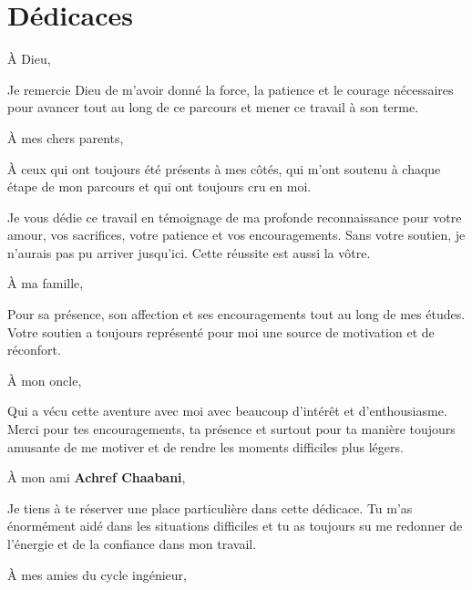 \chapter*{Dédicaces}

\vspace{2cm}

\begin{flushleft}
  À Dieu,

Je remercie Dieu de m'avoir donné la force, la patience et le courage nécessaires
pour avancer tout au long de ce parcours et mener ce travail à son terme.

\vspace{0.4cm}

À mes chers parents,

À ceux qui ont toujours été présents à mes côtés, qui m'ont soutenu à chaque étape
de mon parcours et qui ont toujours cru en moi.

Je vous dédie ce travail en témoignage de ma profonde reconnaissance pour votre amour,
vos sacrifices, votre patience et vos encouragements. Sans votre soutien, je n'aurais
pas pu arriver jusqu'ici. Cette réussite est aussi la vôtre.

\vspace{0.4cm}

À ma famille,

Pour sa présence, son affection et ses encouragements tout au long de mes études.
Votre soutien a toujours représenté pour moi une source de motivation et de réconfort.

\vspace{0.4cm}

À mon oncle,

Qui a vécu cette aventure avec moi avec beaucoup d'intérêt et d'enthousiasme.
Merci pour tes encouragements, ta présence et surtout pour ta manière toujours
amusante de me motiver et de rendre les moments difficiles plus légers.

\vspace{0.4cm}

À mon ami \textbf{Achref Chaabani},

Je tiens à te réserver une place particulière dans cette dédicace.
Tu m'as énormément aidé dans les situations difficiles et tu as toujours su me redonner
de l'énergie et de la confiance dans mon travail.

\vspace{0.4cm}

À mes amies du cycle ingénieur,


\end{flushleft}
